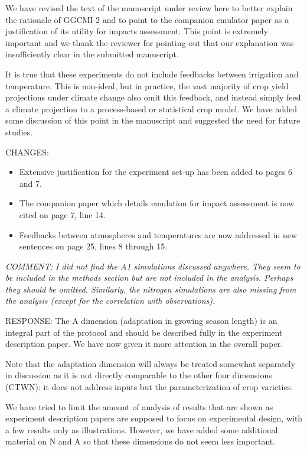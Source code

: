 \documentclass[gmd, manuscript]{copernicus} %
\begin{document}
We have revised the text of the manuscript under review here to better explain the rationale of GGCMI-2 and to point to the companion emulator paper as a justification of its utility for impacts assessment. This point is extremely important and we thank the reviewer for pointing out that our explanation was insufficiently clear in the submitted manuscript.

It is true that these experiments do not include feedbacks between irrigation and temperature. This is non-ideal, but in practice, the vast majority of crop yield projections under climate change also omit this feedback, and instead simply feed a climate projection to a process-based or statistical crop model.  We have added some discussion of this point in the manuscript and suggested the need for future studies.
\smallskip

CHANGES: 
\begin{itemize}
    \item Extensive justification for the experiment set-up has been added to pages 6 and 7. 
    \item The companion paper which details emulation for impact assessment is now cited on page 7, line 14.
    \item Feedbacks between atmospheres and temperatures are now addressed in new sentences on page 25, lines 8 through 15.
\end{itemize}
\smallskip

\textcolor{dark-gray}{\textit{COMMENT: I did not find the A1 simulations discussed anywhere. They seem to be included in the methods section but are not included in the analysis. Perhaps they should be omitted. Similarly, the nitrogen simulations are also missing from the analysis (except for the correlation with observations).}}

RESPONSE: The A dimension (adaptation in growing season length) is an integral part of the protocol and should be described fully in the experiment description paper. We have now given it more attention in the overall paper.

Note that the adaptation dimension will always be treated somewhat separately in discussion as it is not directly comparable to the other four dimensions (CTWN):  it does not address inputs but the parameterization of crop varieties.

We have tried to limit the amount of analysis of results that are shown as experiment description papers are supposed to focus on experimental design, with a few results only as illustrations. However, we have added some additional material on N and A so that these dimensions do not seem less important.
\smallskip
\end{document}
